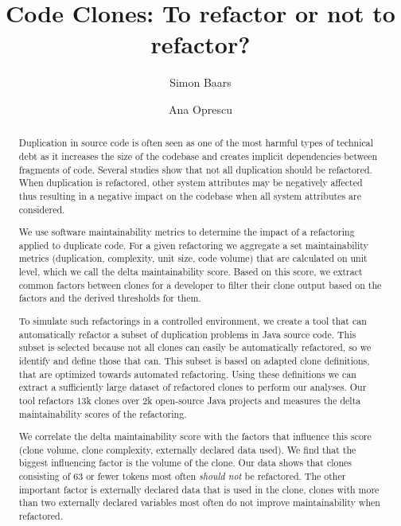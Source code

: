 \documentclass[sigconf,review,anonymous]{acmart}
\begin{document}
\title{Code Clones: To refactor or not to refactor?}

\author{Simon Baars}

\author{Ana Oprescu}

\begin{abstract}
Duplication in source code is often seen as one of the most harmful types of technical debt as it increases the size of the codebase and creates implicit dependencies between fragments of code. Several studies show that not all duplication should be refactored. When duplication is refactored, other system attributes may be negatively affected thus resulting in a negative impact on the codebase when all system attributes are considered.

We use software maintainability metrics to determine the impact of a refactoring applied to duplicate code. For a given refactoring we aggregate a set maintainability metrics (duplication, complexity, unit size, code volume) that are calculated on unit level, which we call the delta maintainability score. %
Based on this score, we extract common factors between clones for a developer to filter their clone output based on the factors and the derived thresholds for them.

To simulate such refactorings in a controlled environment, we create a tool that can automatically refactor a subset of duplication problems in Java source code. This subset is selected because not all clones can easily be automatically refactored, so we identify and define those that can. This subset is based on adapted clone definitions, that are optimized towards automated refactoring. Using these definitions we can extract a sufficiently large dataset of refactored clones to perform our analyses. Our tool refactors 13k clones over 2k open-source Java projects and measures the delta maintainability scores of the refactoring.

We correlate the delta maintainability score with the factors that influence this score (clone volume, clone complexity, externally declared data used). We find that the biggest influencing factor is the volume of the clone. Our data shows that clones consisting of 63 or fewer tokens most often \textit{should not} be refactored. The other important factor is externally declared data that is used in the clone, clones with more than two externally declared variables most often do not improve maintainability when refactored.


\end{abstract}
\end{document}
